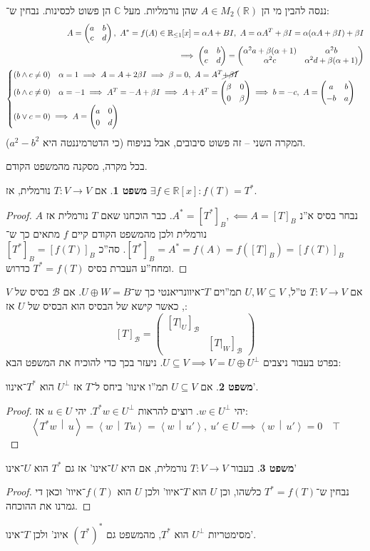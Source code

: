 \documentclass[a4paper]{article}
\newcommand\R     {\mathbb{R}}
\newcommand\C     {\mathbb{C}}
\newcommand\bc    {\mathcal{B}}
\newcommand\ra    {\rangle}
\newcommand\la    {\langle}
\newcommand\co        {\colon}
\newcommand\pms[1]    {\begin{pmatrix}
		#1
\end{pmatrix}}
\newcommand\mut [2]   {\left \la #1 \,\middle\vert\, #2 \right \ra}
\newcommand\ag        {\alpha}
\newcommand\bg        {\beta}
\theoremstyle{definition}
\newtheorem{Theorem}{משפט}
\newcommand\theo  [1] {\begin{Theorem}#1\end{Theorem}}
\begin{document}
	ננסה להבין מי הן $A \in M_2(\R)$ שהן נורמליות. מעל $\C$ הן פשוט לכסינות. נבחין ש־: 
	\begin{align*}
		A = \pms{a & b \\ c & d}, \ A^* = f(A) \in \R_{\le1}[x] = \ag A + BI, \ A = \ag A^T + \bg I = \ag(\ag A + \bg I) + \bg I \\ \implies \pms{a & b \\ c & d} = \pms{\ag^2 a + \bg(\ag + 1) & \ag^2 b \\ \ag^2 c & \ag^2 d + \bg (\ag + 1)} \\
		\begin{cases}
			(b \land c \neq 0 ) \quad \ag = 1 \implies  A = A + 2 \bg I \implies \bg = 0, \ A = A^T \cancel{+ \bg I} \\
			(b \land c \neq 0) \quad \ag = -1 \implies A^T = - A  +\bg I  \implies A + A^T = \pms{\bg & 0 \\ 0 & \bg} \implies b = -c, \ A = \pms{a & b \\ -b & a} \\
			(b \lor c = 0) \implies A = \pms{a & 0 \\ 0 & d}
		\end{cases}
	\end{align*}
	המקרה השני – זה פשוט סיבובים, אבל בניפוח (כי הדטרמיננטה היא $a^2 - b^2$). 
	
	בכל מקרה, מסקנה מהמשפט הקודם. 
	\theo{אם $T \co V \to V$ נורמלית, אז $\exists f \in \R[x] \co f(T) = T^*$. }
	\begin{proof}
		נבחר בסיס א''נ $A^* = [T^*]_B, \impliedby A = [T]_B$. כבר הוכחנו שאם $T$ נורמלית אז $A$ נורמלית ולכן מהמשפט הקודם קיים $f$ מתאים כך ש־$[T^*]_B = A^* = f(A) = f([T]_B) = [f(T)]_B$. סה''כ $[T^*]_B = [f(T)]_B$ ומחח''ע העברת בסיס $T^* = f(T)$ כדרוש. 
	\end{proof}
	
	אם $T \co V \to V$ ט''ל, $U, W \subseteq V$ תמ''וים $T$־איוונריאנטי כך ש־$U \oplus W = B$. אם $\bc$ בסיס של $V$, כאשר קישא של הבסיס הוא הבסיס של $U$ אז: 
	\[ [T]_\bc = \pms{[T|_U]_\bc &  \\  & [T|_W]_\bc} \]
	בפרט בעבור ניצבים $U \subseteq V \implies V = U \oplus U^{\perp}$. ניעזר בכך כדי להוכיח את המשפט הבא: 
	\theo{אם $U \subseteq V$ תמ''ו אינוו' ביחס ל־$T$ אז $U^{\perp}$ הוא $T^*$־אינוו'. }\begin{proof}
		יהי $w \in U^{\perp}$. רוצים להראות $T^*w \in U^{\perp}$. יהי $u \in U$ אז: 
		\[ \mut{T^* w}{u} = \mut{w}{Tu} = \mut{w}{u'}, \ u' \in U \implies \mut{w}{u'} = 0 \quad \top \]
	\end{proof}
	\theo{בעבור $T \co V \to V$ נורמלית, אם היא $U$־אינו' אז גם $T^*$ הוא $U$־אינו'}
	\begin{proof}
		נבחין ש־$T^* = f(T)$ כלשהו, וכן $U$ הוא $T$־איוו' ולכן $U$ הוא $f(T)$־איוו' וכאן די גמרנו את ההוכחה. 
	\end{proof}
	מסימטריות $U^{\perp}$ הוא $T^*$, מהמשפט גם $(T^*)^*$ איונ' ולכן $T$־אינו'. 
	
\end{document}
